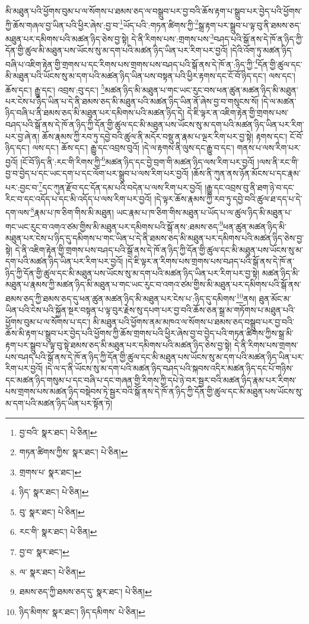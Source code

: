 མི་མཐུན་པའི་ཕྱོགས་བུམ་པ་ལ་སོགས་པ་ཐམས་ཅད་ལ་བསྒྲུབ་པར་བྱ་བའི་ཆོས་རྟག་པ་སྒྲུབ་པར་བྱེད་པའི་ཕྱོགས་ཀྱི་ཆོས་གཞལ་བྱ་ཡིན་པའི་ཕྱིར་ཞེས་:བྱ་བ་\footnote{བྱ་བའི་  སྣར་ཐང་།  པེ་ཅིན། }ཡོད་པའི་:གཏན་ཚིགས་ཀྱི་\footnote{གཏན་ཚིགས་ཀྱིས་  སྣར་ཐང་།  པེ་ཅིན། }སྒྲ་རྟག་པར་སྒྲུབ་པ་ལྟ་བུ་ནི་ཐམས་ཅད་མཐུན་པར་དམིགས་པའི་མཚན་ཉིད་ཅེས་བྱ་སྟེ། དེ་ནི་རིགས་པས་:གྲགས་པས་\footnote{གྲགས་པ་  སྣར་ཐང་། }བཤད་པའི་སྒོ་ནས་དེ་ཁོ་ན་ཉིད་ཀྱི་དོན་གྱི་ཚུལ་མི་མཐུན་པས་ཡོངས་སུ་མ་དག་པའི་མཚན་ཉིད་ཡིན་པར་རིག་པར་བྱའོ། །དེའི་འོག་ཏུ་མཚན་ཉིད་བཞི་པ་འཇིག་རྟེན་གྱི་གྲགས་པ་དང་རིགས་པས་གྲགས་པས་བཤད་པའི་སྒོ་ནས་དེ་ཁོ་ན་:ཉིད་ཀྱི་\footnote{ཉིད་  སྣར་ཐང་།  པེ་ཅིན། }དོན་གྱི་ཚུལ་དང་མི་མཐུན་པའི་ཡོངས་སུ་མ་དག་པའི་མཚན་ཉིད་ཡིན་པས་བསྟན་པའི་ཕྱིར་རྟགས་དང་ངོ་བོ་ཉིད་དང་། ལས་དང་། ཆོས་དང་། རྒྱུ་དང་། འབྲས་:བུ་དང་། \footnote{བུ་  སྣར་ཐང་།  པེ་ཅིན། }མཚན་ཉིད་མི་མཐུན་པ་གང་ཡང་རུང་བས་ཕན་ཚུན་མཚན་ཉིད་མི་མཐུན་པར་ངེས་པ་ཉིད་ཡིན་པ་དེ་ནི་ཐམས་ཅད་མི་མཐུན་པའི་མཚན་ཉིད་ཡིན་ནོ་ཞེས་བྱ་བ་གསུངས་སོ། །དེ་ལ་མཚན་ཉིད་བཞི་པ་ནི་ཐམས་ཅད་མི་མཐུན་པར་དམིགས་པའི་མཚན་ཉིད་དེ། དེ་ཇི་ལྟར་ན་འཇིག་རྟེན་གྱི་གྲགས་པས་བཤད་པའི་སྒོ་ནས་དེ་ཁོ་ན་ཉིད་ཀྱི་དོན་གྱི་ཚུལ་དང་མི་མཐུན་པས་ཡོངས་སུ་མ་དག་པའི་མཚན་ཉིད་ཡིན་པར་རིག་པར་བྱ་ཞེ་ན། ཆོས་རྣམས་ཀྱི་རབ་ཏུ་དབྱེ་བའི་ཚུལ་ནི་མདོར་བསྡུ་ན་རྣམ་པ་ལྔར་རིག་པར་བྱ་སྟེ། རྟགས་དང་། ངོ་བོ་ཉིད་དང་། ལས་དང་། ཆོས་དང་། རྒྱུ་དང་འབྲས་བུའོ། །དེ་ལ་རྟགས་ནི་ལུས་དང་རྒྱུ་བ་དང་། གནས་པ་ལས་རིག་པར་བྱའོ། །ངོ་བོ་ཉིད་ནི་:རང་གི་རིགས་ཀྱི་\footnote{རང་གི་  སྣར་ཐང་།  པེ་ཅིན། }མཚན་ཉིད་དང་བྱེ་བྲག་གི་མཚན་ཉིད་ལས་རིག་པར་བྱའོ། །ལས་ནི་རང་གི་བྱ་བ་བྱེད་པ་དང་ཡང་དག་པ་དང་ལོག་པར་སྒྲུབ་པ་ལས་རིག་པར་བྱའོ། །ཆོས་ནི་ཀུན་ནས་ཉོན་མོངས་པ་དང་རྣམ་པར་:བྱང་བ་\footnote{བྱ་བ་  སྣར་ཐང་། }དང་ཀུན་རྫོབ་དང་དོན་དམ་པའི་བདེན་པ་ལས་རིག་པར་བྱའོ། །རྒྱུ་དང་འབྲས་བུ་ནི་ཐག་ཉེ་བ་དང་རིང་བ་དང་འདོད་པ་དང་མི་འདོད་པ་ལས་རིག་པར་བྱའོ། །དེ་ལྟར་ཆོས་རྣམས་ཀྱི་རབ་ཏུ་དབྱེ་བའི་ཚུལ་ཐ་དད་པ་དེ་དག་ལས་\footnote{ལ་  སྣར་ཐང་།  པེ་ཅིན། }རྣམ་པ་ཁ་ཅིག་གིས་མི་མཐུན། ཡང་རྣམ་པ་ཁ་ཅིག་གིས་མཐུན་པ་ཡོད་པ་ལ་ཚུལ་ཉིད་མི་མཐུན་པ་གང་ཡང་རུང་བ་འགའ་ཙམ་གྱིས་མི་མཐུན་པར་དམིགས་པའི་སྒོ་ནས་:ཐམས་ཅད་\footnote{ཐམས་ཅད་ཀྱི་ཐམས་ཅད་དུ་  སྣར་ཐང་།  པེ་ཅིན། }ཕན་ཚུན་མཚན་ཉིད་མི་མཐུན་པར་ངེས་པ་ཉིད་དུ་དམིགས་པ་གང་ཡིན་པ་དེ་ནི་ཐམས་ཅད་མི་མཐུན་པར་དམིགས་པའི་མཚན་ཉིད་ཅེས་བྱ་སྟེ། དེ་ནི་འཇིག་རྟེན་གྱི་གྲགས་པས་བཤད་པའི་སྒོ་ནས་དེ་ཁོ་ན་ཉིད་ཀྱི་དོན་གྱི་ཚུལ་དང་མི་མཐུན་པས་ཡོངས་སུ་མ་དག་པའི་མཚན་ཉིད་ཡིན་པར་རིག་པར་བྱའོ། །དེ་ཇི་ལྟར་ན་རིགས་པས་གྲགས་པས་བཤད་པའི་སྒོ་ནས་དེ་ཁོ་ན་ཉིད་ཀྱི་དོན་གྱི་ཚུལ་དང་མི་མཐུན་པས་ཡོངས་སུ་མ་དག་པའི་མཚན་ཉིད་ཡིན་པར་རིག་པར་བྱ་སྟེ། མཚན་ཉིད་མི་མཐུན་པ་རྣམས་ཀྱི་མཚན་ཉིད་མི་མཐུན་པ་གང་ཡང་རུང་བ་འགའ་ཙམ་གྱིས་མི་མཐུན་པར་དམིགས་པའི་སྒོ་ནས་ཐམས་ཅད་ཀྱི་ཐམས་ཅད་དུ་ཕན་ཚུན་མཚན་ཉིད་མི་མཐུན་པར་ངེས་པ་:ཉིད་དུ་དམིགས་\footnote{ཉིད་མིགས་  སྣར་ཐང་། ཉིད་དམིགས་  པེ་ཅིན། }ནས། ཐུན་མོང་མ་ཡིན་པའི་ངེས་པའི་སྐྱོན་སྔར་བསྟན་པ་ལྟ་བུར་རྗེས་སུ་དཔག་པར་བྱ་བའི་ཆོས་ཅན་སྒྲ་མ་གཏོགས་པ་མཐུན་པའི་ཕྱོགས་བུམ་པ་ལ་སོགས་པ་དང་། མི་མཐུན་པའི་ཕྱོགས་ནམ་མཁའ་ལ་སོགས་པ་ཐམས་ཅད་བསྒྲུབ་པར་བྱ་བའི་ཆོས་མི་རྟག་པ་སྒྲུབ་པར་བྱེད་པའི་ཕྱོགས་ཀྱི་ཆོས་གྲགས་པའི་ཕྱིར་ཞེས་བྱ་བ་བྱེད་པའི་གཏན་ཚིགས་ཀྱིས་སྒྲ་མི་རྟག་པར་སྒྲུབ་པ་ལྟ་བུ་སྟེ་ཐམས་ཅད་མི་མཐུན་པར་དམིགས་པའི་མཚན་ཉིད་ཅེས་བྱ་སྟེ། དེ་ནི་རིགས་པས་གྲགས་པས་བཤད་པའི་སྒོ་ནས་དེ་ཁོ་ན་ཉིད་ཀྱི་དོན་གྱི་ཚུལ་དང་མི་མཐུན་པས་ཡོངས་སུ་མ་དག་པའི་མཚན་ཉིད་ཡིན་པར་རིག་པར་བྱའོ། །དེ་ལ་ད་ནི་ཡོངས་སུ་མ་དག་པའི་མཚན་ཉིད་བཤད་པའི་སྐབས་འདིར་མཚན་ཉིད་དང་པོ་གཉིས་དང་མཚན་ཉིད་གསུམ་པ་དང་བཞི་པ་དང་གཞན་གྱི་རིགས་ཀྱི་དཔེ་ཉེ་བར་སྦྱར་བའི་མཚན་ཉིད་རྣམ་པར་རིགས་པས་གྲགས་པས་མཚན་ཉིད་བསྡེབས་ཏེ་སྦྱར་བའི་སྒོ་ནས་དེ་ཁོ་ན་ཉིད་ཀྱི་དོན་གྱི་ཚུལ་དང་མི་མཐུན་པས་ཡོངས་སུ་མ་དག་པའི་མཚན་ཉིད་ཡིན་པར་སྟོན་ཏེ། 